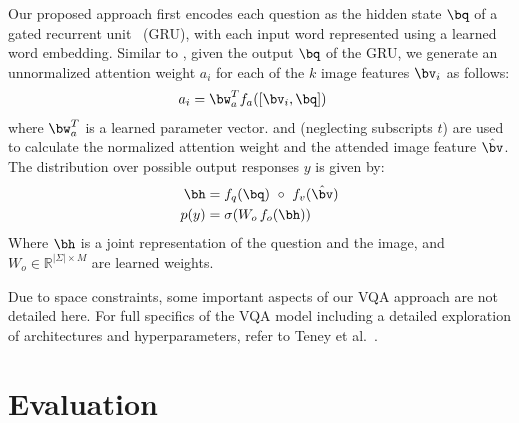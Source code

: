 \documentclass[10pt,twocolumn,letterpaper]{article}
\begin{document}
Our proposed approach first encodes each question as the hidden state $\bq$ of a gated recurrent unit~\cite{cho2014learning} (GRU), with each input word represented using a learned word embedding. Similar to , given the output $\bq$ of the GRU, we generate an unnormalized attention weight $a_{i}$ for each of the $k$ image features $\bv_i$ as follows:
\begin{align}
\label{eqn:att-vqa}
a_{i} &= \bw_a^T  f_a( [\bv_i,\bq])
\end{align}
\noindent
where $\bw_a^T$ is a learned parameter vector.  and  (neglecting subscripts $t$) are used to calculate the normalized attention weight and the attended image feature $\hat{\bv}$. The distribution over possible output responses $y$ is given by:
\begin{align}
\bh &= f_q(\bq) ~\circ~ f_v(\hat{\bv})\\
p(y) &= \sigma(W_{o} \, f_o(\bh) )
\end{align}
Where $\bh$ is a joint representation of the question and the image, and $W_{o} \in \mathbb{R}^{\vert\Sigma\vert \times M}$ are learned weights. 

Due to space constraints, some important aspects of our VQA approach are not detailed here. For full specifics of the VQA model including a detailed exploration of architectures and hyperparameters, refer to Teney et al.~\cite{teney2017tips}. 


\section{Evaluation}
\end{document}
